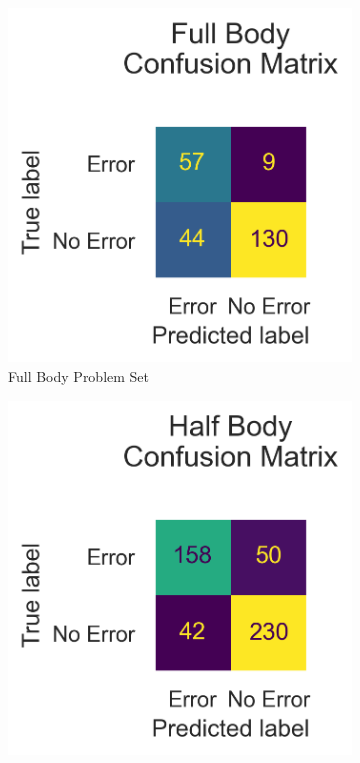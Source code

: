 \begin{figure}[!htbp]
  \centering
  \begin{subfigure}[b]{0.4\linewidth}
      \centering
      \includegraphics[width=\textwidth]{figures/Results_lo/v1/confusion/full_together.png}
      \caption[]{Full Body Problem Set}
      \label{fig:fb_conf_v1}
  \end{subfigure}
  \hfill
  \begin{subfigure}[b]{0.4\linewidth}
      \centering
      \includegraphics[width=\textwidth]{figures/Results_lo/v1/confusion/half_together.png}

\end{subfigure}
\end{figure}
